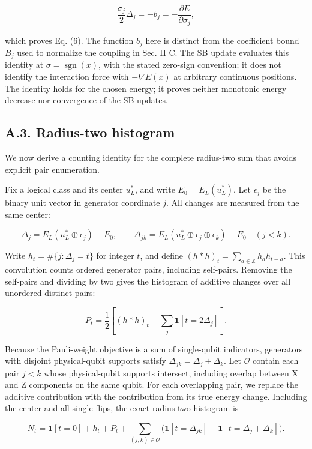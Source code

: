 \documentclass[
  10pt,
]{article}
\begin{document}
\[
\frac{\sigma_j}{2}\Delta_j=-b_j
=-\frac{\partial E}{\partial\sigma_j},
\]

which proves Eq. (6). The function \(b_j\) here is distinct from the
coefficient bound \(B_j\) used to normalize the coupling in Sec. II C.
The SB update evaluates this identity at
\(\sigma=\operatorname{sgn}(x)\), with the stated zero-sign convention;
it does not identify the interaction force with \(-\nabla E(x)\) at
arbitrary continuous positions. The identity holds for the chosen
energy; it proves neither monotonic energy decrease nor convergence of
the SB updates.

\subsection{A.3. Radius-two
histogram}\label{a.3.-radius-two-histogram}

We now derive a counting identity for the complete radius-two sum that
avoids explicit pair enumeration.

Fix a logical class and its center \(u_L^*\), and write
\(E_0=E_L(u_L^*)\). Let \(\epsilon_j\) be the binary unit vector in
generator coordinate \(j\). All changes are measured from the same
center:

\[
\Delta_j=E_L(u_L^*\oplus\epsilon_j)-E_0,
\qquad
\Delta_{jk}=E_L(u_L^*\oplus\epsilon_j\oplus\epsilon_k)-E_0
\quad(j<k).
\]

Write \(h_t=\#\{j:\Delta_j=t\}\) for integer \(t\), and define
\((h*h)_t=\sum_{a\in\mathbb Z}h_a h_{t-a}\). This convolution counts
ordered generator pairs, including self-pairs. Removing the self-pairs
and dividing by two gives the histogram of additive changes over all
unordered distinct pairs:

\[
P_t=\frac12\left[(h*h)_t-\sum_j\mathbf1[t=2\Delta_j]\right].
\tag{A1}\label{eq:A1}
\]

Because the Pauli-weight objective is a sum of single-qubit indicators,
generators with disjoint physical-qubit supports satisfy
\(\Delta_{jk}=\Delta_j+\Delta_k\). Let \(\mathcal O\) contain each pair
\(j<k\) whose physical-qubit supports intersect, including overlap
between X and Z components on the same qubit. For each overlapping pair,
we replace the additive contribution with the contribution from its true
energy change. Including the center and all single flips, the exact
radius-two histogram is

\[
N_t=\mathbf1[t=0]+h_t+P_t
+\sum_{(j,k)\in\mathcal O}
\bigl(\mathbf1[t=\Delta_{jk}]-\mathbf1[t=\Delta_j+\Delta_k]\bigr).
\tag{A2}\label{eq:A2}
\]
\end{document}
